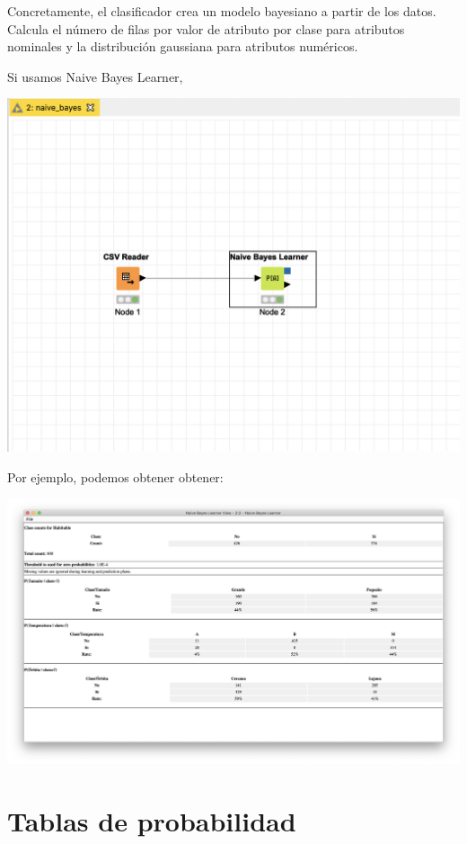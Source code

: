 \documentclass[11pt]{exam}
\begin{document}
\begin{questions}
Concretamente, el clasificador crea un modelo bayesiano a partir de los datos. Calcula el número de filas por valor de atributo por clase para atributos nominales y la distribución gaussiana para atributos numéricos. 

Si usamos Naive Bayes Learner, 

\begin{center}
	\includegraphics[scale=0.35]{workflow.png}
\end{center}

Por ejemplo, podemos obtener obtener:

\begin{center}
	\includegraphics[scale=0.3]{table.png}
\end{center}

\section*{Tablas de probabilidad}


\end{questions}
\end{document}
